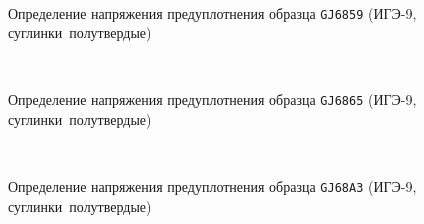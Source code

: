     \begin{figure}
        {\centering
            \small
            \hfill 
            \\
            \hfill   
            \hfill 
            }
            \caption{Определение напряжения предуплотнения образца \texttt{GJ6859} (ИГЭ-9, суглинки полутвердые)}
            \label{img:6859}
    \end{figure}
        
    \begin{figure}
        {\centering
            \small
            \hfill 
            \\
            \hfill   
            \hfill 
            }
            \caption{Определение напряжения предуплотнения образца \texttt{GJ6865} (ИГЭ-9, суглинки полутвердые)}
            \label{img:6865}
    \end{figure}
        
    \begin{figure}
        {\centering
            \small
            \hfill 
            \\
            \hfill   
            \hfill 
            }
            \caption{Определение напряжения предуплотнения образца \texttt{GJ68A3} (ИГЭ-9, суглинки полутвердые)}
            \label{img:68A3}
    \end{figure}
        
